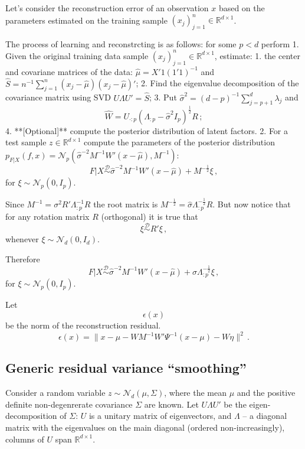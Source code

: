 \documentclass[a4paper,14pt]{article}
\newcommand{\Real}{\mathbb{R}}
\begin{document}
Let's consider the reconstruction error of an observation $x$ based on the parameters
estimated on the training sample $(x_j)_{j=1}^n\in \Real^{d\times 1}$.

The process of learning and reconstrcting is as follows: for some $p<d$ perform
1. Given the original training data sample $(x_j)_{j=1}^n\in \Real^{d\times 1}$, estimate:
    1. the center and covariane matrices of the data:
        $\hat{\mu} = X'1(1'1)^{-1}$ and $\hat{S} = n^{-1}\sum_{j=1}^n (x_j-\hat{\mu})(x_j-\hat{\mu})'$;
    2. Find the eigenvalue decomposition of the covariance matrix using SVD $U \Lambda U' = \hat{S}$;
    3. Put $\hat{\sigma}^2 = (d-p)^{-1}\sum_{j=p+1}^d \lambda_j$ and
        $$\hat{W} = U_{\cdot:p} (\Lambda_{:p} - \hat{\sigma}^2 I_p)^\frac{1}{2} R\,;$$
    4. **[Optional]** compute the posterior distribution of latent factors.
2. For a test sample $z\in \Real^{d\times 1}$ compute the parameters of the posterior
distribution $p_{F|X}(f, x) = \mathcal{N}_p(\hat{\sigma}^{-2}M^{-1}W'(x-\hat{\mu}), M^{-1})$:
$$ F|X \overset{\mathcal{D}}{\sim} \hat{\sigma}^{-2}M^{-1}W'(x-\hat{\mu}) + M^{-\frac{1}{2}}\xi\,,$$
for $\xi\sim\mathcal{N}_p(0,I_p)$.

Since $M^{-1} = \sigma^2 R' \Lambda_{:p}^{-1} R$ the root matrix is
$M^{-\frac{1}{2}} = \hat{\sigma} \Lambda_{:p}^{-\frac{1}{2}} R$.
But now notice that for any rotation matrix $R$ (orthogonal) it is true that
$$\xi \overset{\mathcal{D}}{\sim} R'\xi\,,$$
whenever $\xi \sim \mathcal{N}_d(0, I_d)$.

Therefore 
$$ F|X \overset{\mathcal{D}}{\sim}
    \hat{\sigma}^{-2}M^{-1}W'(x-\hat{\mu})
    + \hat{\sigma} \Lambda_{:p}^{-\frac{1}{2}}\xi\,,$$
for $\xi\sim\mathcal{N}_p(0,I_p)$.

Let $$ \epsilon(x)$$ be the norm of the reconstruction residual.
$$\epsilon(x) = \|x-\mu - W M^{-1}W'\Psi^{-1}(x-\mu) - W\eta\|^2 \,.$$




\subsection{Generic residual variance ``smoothing''} %
\label{sub:generic_residual_variance_smoothing}

Consider a random variable $z\sim \mathcal{N}_d(\mu, \Sigma)$, where the mean $\mu$
and the positive definite non-degenrerate covariance $\Sigma$ are known. Let $U \Lambda U'$
be the eigen-decomposition of $\Sigma$: $U$ is a unitary matrix of eigenvectors, and
$\Lambda$ -- a diagonal matrix with the eigenvalues on the main diagonal (ordered
non-increasingly), columns of $U$ span $\Real^{d\times 1}$.
\end{document}
